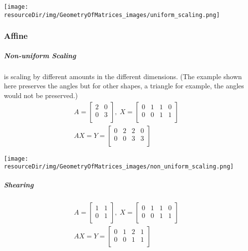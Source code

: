 \documentclass[../MathsNotesBase.tex]{subfiles}
\begin{document}
{		\begin{center}
		\texttt{[image: \\resourceDir/img/GeometryOfMatrices\_images/uniform\_scaling.png]}
		\end{center}
		
		\subsubsection{Affine}
		\subparagraph{Non-uniform Scaling} is scaling by different amounts in the different dimensions. (The example shown here preserves the angles but for other shapes, a triangle for example, the angles would not be preserved.)
		\begin{align*}
		A =
		\begin{bmatrix}    
		2  &  0 \\
		0  &  3 \\		
		\end{bmatrix}
		,\; X = 
		\begin{bmatrix}  
		0   &  1  &   1  &   0 \\
		0   &  0  &   1  &   1	\\	
		\end{bmatrix} \\[10pt]
		AX = Y = 
		\begin{bmatrix}   
		0  &   2  &  2  &  0 \\
		0  &   0  &  3  &  3 \\
		\end{bmatrix}
		\end{align*}
	
		\begin{center}
		\texttt{[image: \\resourceDir/img/GeometryOfMatrices\_images/non\_uniform\_scaling.png]}
		\end{center}
		
		\subparagraph{Shearing}
		\begin{align*}
		A =
		\begin{bmatrix}    
		1  &  1 \\
		0  &  1 \\		
		\end{bmatrix}
		,\; X = 
		\begin{bmatrix}  
		0   &  1  &   1  &   0 \\
		0   &  0  &   1  &   1	\\	
		\end{bmatrix} \\[10pt]
		AX = Y = 
		\begin{bmatrix}   
		0  &   1  &  2  &  1 \\
		0  &   0  &  1  &  1 \\
		\end{bmatrix}
		\end{align*}
	
}
\end{document}

